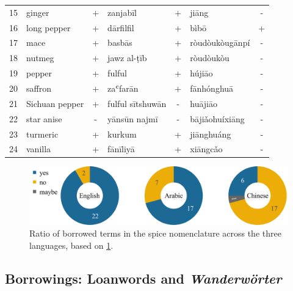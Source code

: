 \begin{table}[ht]
\begin{tabular}{@{}rlclclc@{}}
15          & ginger           & +           & zanjabīl         & +           & jiāng            & -           \\
16          & long pepper      & +           & dārfilfil        & +           & bìbō             & +           \\
17          & mace             & +           & basbās           & +           & ròudòukòugānpí   & -           \\
18          & nutmeg           & +           & jawz al-ṭīb      & +           & ròudòukòu        & -           \\
19          & pepper           & +           & fulful           & +           & hújiāo           & -           \\
20          & saffron          & +           & zaʿfarān         & +           & fānhónghuā       & -           \\
21          & Sichuan pepper   & +           & fulful sītshuwān & -           & huājiāo          & -           \\
22          & star anise       & -           & yānsūn najmī     & -           & bājiǎohuíxiāng   & -           \\
23          & turmeric         & +           & kurkum           & +           & jiānghuáng       & -           \\
24          & vanilla          & +           & fānīliyā         & +           & xiāngcǎo         & -           \\ \bottomrule
\end{tabular}
\label{table:borrowings}
\end{table}


\begin{figure}[ht!]
  \includegraphics[width=\linewidth]{imgs/plots/borrowing_pie.pdf}
  \caption[{Ratio of borrowed and not borrowed terms in the spice nomenclature.}]{Ratio of borrowed terms in the spice nomenclature across the three languages, based on \cref{table:borrowings}.}
  \label{fig:borrowing_pie}
\end{figure}

\subsection{Borrowings: Loanwords and \textit{Wanderwörter}}

